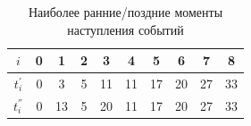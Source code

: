 \documentclass[a4paper,14pt]{extarticle}
\begin{document}
%
%
%

\begin{table}[H]
\caption{Наиболее ранние/поздние моменты наступления событий}
\label{tabular:timesandtenses1}
\begin{center}
\begin{tabular}{|c|c|c|c|c|c|c|c|c|c|}
\hline
$i$ & 0 & 1 & 2 & 3 & 4 & 5 & 6 & 7 & 8\\ \hline
${t}^{'}_{i}$ & 0 & 3 & 5 & 11 & 11 & 17 & 20 & 27 & 33\\ \hline
${t}^{''}_{i}$ & 0 & 13 & 5 & 20 & 11 & 17 & 20 & 27 & 33\\ \hline
\end{tabular}
\end{center}
\end{table}
\end{document}
